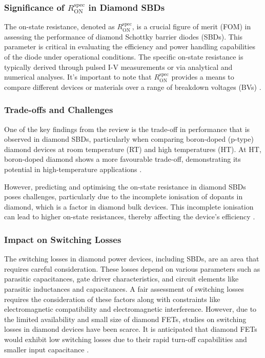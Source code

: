 \subsubsection{Significance of \( R_{\text{ON}}^{\text{spec}} \) in Diamond SBDs}
The on-state resistance, denoted as \( R_{\text{ON}}^{\text{spec}} \), is a crucial figure of merit (FOM) in assessing the performance of diamond Schottky barrier diodes (SBDs). This parameter is critical in evaluating the efficiency and power handling capabilities of the diode under operational conditions. The specific on-state resistance is typically derived through pulsed I-V measurements or via analytical and numerical analyses. It's important to note that \( R_{\text{ON}}^{\text{spec}} \) provides a means to compare different devices or materials over a range of breakdown voltages (BVs) \cite{donato2020}.

\subsubsection{Trade-offs and Challenges}
One of the key findings from the review is the trade-off in performance that is observed in diamond SBDs, particularly when comparing boron-doped (p-type) diamond devices at room temperature (RT) and high temperatures (HT). At HT, boron-doped diamond shows a more favourable trade-off, demonstrating its potential in high-temperature applications \cite{donato2020}.

However, predicting and optimising the on-state resistance in diamond SBDs poses challenges, particularly due to the incomplete ionisation of dopants in diamond, which is a factor in diamond bulk devices. This incomplete ionisation can lead to higher on-state resistances, thereby affecting the device's efficiency \cite{donato2020}.

\subsubsection{Impact on Switching Losses}
The switching losses in diamond power devices, including SBDs, are an area that requires careful consideration. These losses depend on various parameters such as parasitic capacitances, gate driver characteristics, and circuit elements like parasitic inductances and capacitances. A fair assessment of switching losses requires the consideration of these factors along with constraints like electromagnetic compatibility and electromagnetic interference. However, due to the limited availability and small size of diamond FETs, studies on switching losses in diamond devices have been scarce. It is anticipated that diamond FETs would exhibit low switching losses due to their rapid turn-off capabilities and smaller input capacitance \cite{donato2020}.

